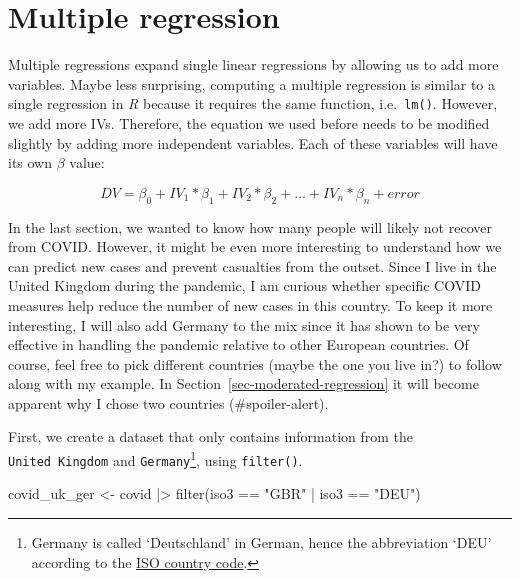\documentclass[
  letterpaper,
  DIV=11,
  numbers=noendperiod]{scrreprt}
\newenvironment{Shaded}{\begin{snugshade}}{\end{snugshade}}
\newcommand{\FunctionTok}[1]{\textcolor[rgb]{0.28,0.35,0.67}{#1}}
\newcommand{\NormalTok}[1]{\textcolor[rgb]{0.00,0.23,0.31}{#1}}
\newcommand{\OtherTok}[1]{\textcolor[rgb]{0.00,0.23,0.31}{#1}}
\newcommand{\SpecialCharTok}[1]{\textcolor[rgb]{0.37,0.37,0.37}{#1}}
\newcommand{\StringTok}[1]{\textcolor[rgb]{0.13,0.47,0.30}{#1}}
\begin{document}
\section{Multiple regression}\label{sec-multiple-regression}

Multiple regressions expand single linear regressions by allowing us to
add more variables. Maybe less surprising, computing a multiple
regression is similar to a single regression in \emph{R} because it
requires the same function, i.e.~\texttt{lm()}. However, we add more
IVs. Therefore, the equation we used before needs to be modified
slightly by adding more independent variables. Each of these variables
will have its own \(\beta\) value:

\[
DV = \beta_{0} + IV_{1} * \beta_{1} + IV_{2} * \beta_{2} + ... + IV_{n} * \beta_{n} + error
\]

In the last section, we wanted to know how many people will likely not
recover from COVID. However, it might be even more interesting to
understand how we can predict new cases and prevent casualties from the
outset. Since I live in the United Kingdom during the pandemic, I am
curious whether specific COVID measures help reduce the number of new
cases in this country. To keep it more interesting, I will also add
Germany to the mix since it has shown to be very effective in handling
the pandemic relative to other European countries. Of course, feel free
to pick different countries (maybe the one you live in?) to follow along
with my example. In Section~\ref{sec-moderated-regression} it will
become apparent why I chose two countries (\#spoiler-alert).

First, we create a dataset that only contains information from the
\texttt{United\ Kingdom} and \texttt{Germany}\footnote{Germany is called
  `Deutschland' in German, hence the abbreviation `DEU' according to the
  \href{https://www.iso.org/obp/ui/\#iso:code:3166:DE}{ISO country
  code}.}, using \texttt{filter()}.

\begin{Shaded}
\begin{Highlighting}[]
\NormalTok{covid\_uk\_ger }\OtherTok{\textless{}{-}}
\NormalTok{  covid }\SpecialCharTok{|\textgreater{}}
  \FunctionTok{filter}\NormalTok{(iso3 }\SpecialCharTok{==} \StringTok{"GBR"} \SpecialCharTok{|}\NormalTok{ iso3 }\SpecialCharTok{==} \StringTok{"DEU"}\NormalTok{)}
\end{Highlighting}
\end{Shaded}
\end{document}

